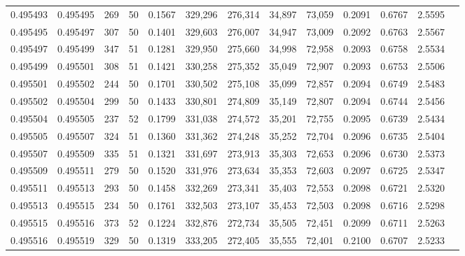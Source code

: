 \begin{tabular}{rrrrrrrrrrrrr}
0.495493 & 0.495495 &   269 &  50 &                                     0.1567 & 329,296 & 276,314 &  34,897 &  73,059 & 0.2091 & 0.6767 & 2.5595 \\
0.495495 & 0.495497 &   307 &  50 &                                     0.1401 & 329,603 & 276,007 &  34,947 &  73,009 & 0.2092 & 0.6763 & 2.5567 \\
0.495497 & 0.495499 &   347 &  51 &                                     0.1281 & 329,950 & 275,660 &  34,998 &  72,958 & 0.2093 & 0.6758 & 2.5534 \\
0.495499 & 0.495501 &   308 &  51 &                                     0.1421 & 330,258 & 275,352 &  35,049 &  72,907 & 0.2093 & 0.6753 & 2.5506 \\
0.495501 & 0.495502 &   244 &  50 &                                     0.1701 & 330,502 & 275,108 &  35,099 &  72,857 & 0.2094 & 0.6749 & 2.5483 \\
0.495502 & 0.495504 &   299 &  50 &                                     0.1433 & 330,801 & 274,809 &  35,149 &  72,807 & 0.2094 & 0.6744 & 2.5456 \\
0.495504 & 0.495505 &   237 &  52 &                                     0.1799 & 331,038 & 274,572 &  35,201 &  72,755 & 0.2095 & 0.6739 & 2.5434 \\
0.495505 & 0.495507 &   324 &  51 &                                     0.1360 & 331,362 & 274,248 &  35,252 &  72,704 & 0.2096 & 0.6735 & 2.5404 \\
0.495507 & 0.495509 &   335 &  51 &                                     0.1321 & 331,697 & 273,913 &  35,303 &  72,653 & 0.2096 & 0.6730 & 2.5373 \\
0.495509 & 0.495511 &   279 &  50 &                                     0.1520 & 331,976 & 273,634 &  35,353 &  72,603 & 0.2097 & 0.6725 & 2.5347 \\
0.495511 & 0.495513 &   293 &  50 &                                     0.1458 & 332,269 & 273,341 &  35,403 &  72,553 & 0.2098 & 0.6721 & 2.5320 \\
0.495513 & 0.495515 &   234 &  50 &                                     0.1761 & 332,503 & 273,107 &  35,453 &  72,503 & 0.2098 & 0.6716 & 2.5298 \\
0.495515 & 0.495516 &   373 &  52 &                                     0.1224 & 332,876 & 272,734 &  35,505 &  72,451 & 0.2099 & 0.6711 & 2.5263 \\
0.495516 & 0.495519 &   329 &  50 &                                     0.1319 & 333,205 & 272,405 &  35,555 &  72,401 & 0.2100 & 0.6707 & 2.5233 \\

\end{tabular}
